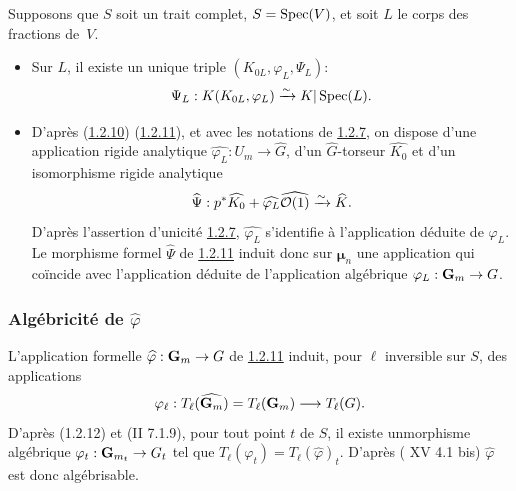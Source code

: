 \documentclass[10pt]{../fichiers-configuration-latex/smfart}
\begin{document}
Supposons que $S$ soit un trait complet, $S=\operatorname{Spec}(V)$, et soit $L$ le
corps des fractions de~$V$.
\begin{itemize}
\item[a)] Sur $L$, il existe un unique triple
  $(K_{0L},\varphi_{L},\Psi_{L})$:
$$
\Psi_{L}:K(K_{0L},\varphi_{L})\xrightarrow{\sim} K|\operatorname{Spec} (L){}.
$$

\item[b)] D'après (\hyperref[XVIII.subsubsec1.2.10]{1.2.10}) (\hyperref[XVIII.subsubsec1.2.11]{1.2.11}),
et avec les notations de \hyperref[XVIII.subsubsec1.2.7]{1.2.7},
  on dispose d'une application rigide analytique
  $\widehat{\varphi_{L}}:U_{m}\rightarrow \widehat{G}$, d'un
  $\widehat{G}$-torseur $\widehat{K_{0}}$ et d'un
  isomorphisme rigide analytique
$$
\widehat{\Psi}:p^{\ast}\widehat{K_0}+\widehat{\varphi_{L}}
\widehat{{\mathcal O}(1)}\xrightarrow{\sim}
\widehat{K}{}.
$$
D'après l'assertion d'unicité \hyperref[XVIII.subsubsec1.2.7]{1.2.7},
$\widehat{\varphi_{L}}$ 
s'identifie à l'application déduite de $\varphi_{L}$. Le morphisme
formel $\widehat{\Psi}$ de \hyperref[XVIII.subsubsec1.2.11]{1.2.11} induit donc sur
$𝛍_{n}$ une application qui 
coïncide avec l'application déduite de l'application algébrique
$\varphi_{L}:\mathbf{G}_{m}\rightarrow G$.
\end{itemize}

\subsubsection{Algébricité de $\widehat{\varphi}$}

L'application formelle $\widehat{\varphi}:\mathbf{G}_{m}\rightarrow G$
de \hyperref[XVIII.subsubsec1.2.11]{1.2.11} induit, pour $\ell$ inversible sur $S$,
des applications 
$$
\varphi_{\ell}:T_{\ell}(\widehat{\mathbf{G}_{m}})=T_{\ell}(\mathbf{G}_{m})\longrightarrow
T_{\ell}(G){}.
$$
D'après (1.2.12) et (\EGA II 7.1.9), pour tout point $t$ de $S$, il
existe un\pageoriginale  morphisme algébrique
$\varphi_{t}:\mathbf{G}_{m_{t}}\rightarrow G_{t}$ tel que
$T_{\ell}(\varphi_{t})=T_{\ell}(\widehat{\varphi})_{t}$. D'après ( XV 4.1
  bis) $\widehat{\varphi}$ est donc algébrisable.
\end{document}
